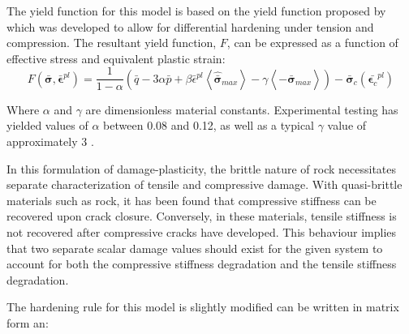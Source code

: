 The yield function for this model is based on the yield function proposed by \citet{lee_plastic-damage_1998} which was developed to allow for differential hardening under tension and compression. The resultant yield function, $F$, can be expressed as a function of effective stress and equivalent plastic strain:
\begin{equation}
    F
    \left(
        \boldsymbol{\bar{\sigma}},\bar{\boldsymbol{\epsilon}}^{pl}
    \right)
    =
    \frac{1}{1-\alpha}
    \left(
        \bar{q}-3\alpha\bar{p}+\beta\bar{\epsilon}^{pl}
        \left\langle\hat{\bar{\boldsymbol{\sigma}}}_{max}\right\rangle-\gamma\left\langle-\hat{\bar{\boldsymbol{\sigma}}}_{max}\right\rangle\right)
    -\bar{\boldsymbol{\sigma}}_{c}
    \left(
        \bar{\boldsymbol{\epsilon}_{c}}^{pl}
    \right)
\label{eqn:const10}
\end{equation}

Where $\alpha$ and $\gamma$ are dimensionless material constants. Experimental testing has yielded values of $\alpha$ between 0.08 and 0.12, as well as a typical $\gamma$ value of approximately 3 \cite{lubliner_plastic-damage_1989}. 

In this formulation of damage-plasticity, the brittle nature of rock
necessitates separate characterization of tensile and compressive
damage. With quasi-brittle materials such as rock, it has been found that compressive stiffness can be recovered upon crack closure. Conversely, in these materials, tensile stiffness is not recovered after compressive cracks have developed. This behaviour implies that two separate scalar damage values should exist for the given system to account for both the compressive stiffness degradation and the tensile stiffness degradation. 




The hardening rule for this model is slightly modified can be written in matrix form an:

